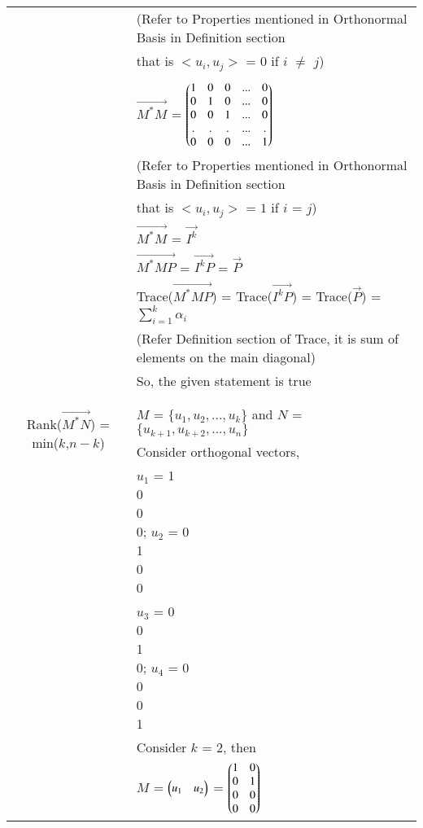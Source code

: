 \documentclass[journal,12pt]{IEEEtran}
\begin{document}
\begin{longtable}{|c|l|}
	 & (Refer to Properties mentioned in Orthonormal Basis in Definition section\\
	 & that is $<u_i,u_j>$ = $0$ if $i$ $\ne$ $j$)\\
	 & \\
	 & $\vec{M^*M}$ = $\begin{pmatrix}1&0&0&...&0\\
	                           0&1&0&...&0\\
	                           0&0&1&...&0\\
	                           .&.&.&...&.\\
	                           0&0&0&...&1\end{pmatrix}$\\
	& (Refer to Properties mentioned in Orthonormal Basis in Definition section\\
	& that is $<u_i,u_j>$ = $1$ if $i$ = $j$)\\
    & $\vec{M^*M}$ = $\vec{I^{k}}$\\
    & $\vec{M^*MP}$ = $\vec{I^{k}P}$ = $\vec{P}$\\
    & Trace($\vec{{M}^*MP}$) = Trace($\vec{I^{k}P}$) =  Trace($\vec{P}$) = $\sum_{i=1}^{k}\alpha_i$\\
    & (Refer Definition section of Trace, it is sum of elements on the main diagonal)\\
    & So, the given statement is true \\
	& \\
	\hline
	\multirow{3}{*}{Rank($\vec{{M}^*N}$) = min($k$,$n-k$)} 
	& \\
	& $M$ = $\{u_1,u_2,...,u_k\}$ and $N$ = $\{u_{k+1},u_{k+2},...,u_n\}$ \\
	& Consider orthogonal vectors,\\
	& $u_1$ = \myvec{1\\0\\0\\0}; $u_2$ = \myvec{0\\1\\0\\0}\\
	& $u_3$ = \myvec{0\\0\\1\\0}; $u_4$ = \myvec{0\\0\\0\\1}\\
	& Consider $k$ = 2, then \\
	& $M$ = $\begin{pmatrix}u_1&u_2\end{pmatrix}$ = $\begin{pmatrix}1&0\\0&1\\0&0\\0&0\end{pmatrix}$\\

\end{longtable}
\end{document}
